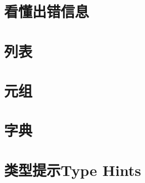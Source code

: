 \documentclass[
]{book}
\begin{document}
\hypertarget{ux770bux61c2ux51faux9519ux4fe1ux606f}{%
\section{看懂出错信息}\label{ux770bux61c2ux51faux9519ux4fe1ux606f}}

\hypertarget{ux5217ux8868}{%
\section{列表}\label{ux5217ux8868}}

\hypertarget{ux5143ux7ec4}{%
\section{元组}\label{ux5143ux7ec4}}

\hypertarget{ux5b57ux5178}{%
\section{字典}\label{ux5b57ux5178}}

\hypertarget{ux7c7bux578bux63d0ux793atype-hints}{%
\section{类型提示Type Hints}\label{ux7c7bux578bux63d0ux793atype-hints}}
\end{document}
